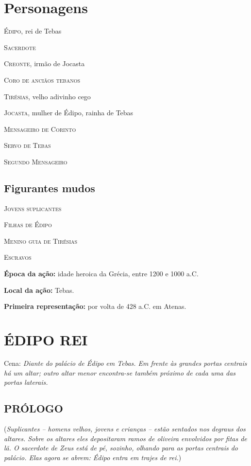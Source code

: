 
\chapter{Personagens}

\textsc{Édipo,} rei de Tebas

\textsc{Sacerdote}

\textsc{Creonte,} irmão de Jocasta

\textsc{Coro de anciãos tebanos}

\textsc{Tirésias,} velho adivinho cego

\textsc{Jocasta,} mulher de Édipo, rainha de Tebas

\textsc{Mensageiro de Corinto}

\textsc{Servo de Tebas}

\textsc{Segundo Mensageiro}


\section{Figurantes mudos} 

\textsc{Jovens suplicantes} 

\textsc{Filhas de Édipo}

\textsc{Menino guia de Tirésias}

\textsc{Escravos}

\textbf{Época da ação:} idade heroica da Grécia, entre 1200 e 1000 a.C.

\textbf{Local da ação:} Tebas.

\textbf{Primeira representação:} por volta de 428 a.C. em Atenas.


\clearpage

\chapter{ÉDIPO REI}

Cena: \emph{Diante do palácio de Édipo em Tebas. Em frente às grandes
portas centrais há um altar; outro altar menor encontra-se também
próximo de cada uma das portas laterais. }

\section{PRÓLOGO}

(\emph{Suplicantes -- homens velhos, jovens e crianças -- estão sentados
nos degraus dos altares. Sobre os altares eles depositaram ramos de
oliveira envolvidos por fitas de lã. O sacerdote de Zeus está de pé,
sozinho, olhando para as portas centrais do palácio. Elas agora se
abrem: Édipo entra em trajes de rei.})

